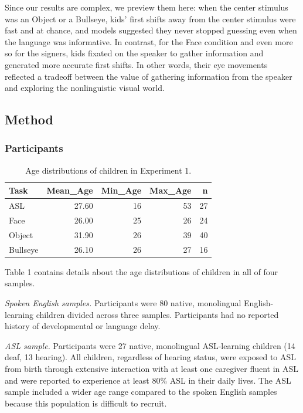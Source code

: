 \documentclass[10pt, letterpaper]{article}
\begin{document}
Since our results are complex, we preview them here: when the center
stimulus was an Object or a Bullseye, kids' first shifts away from the
center stimulus were fast and at chance, and models suggested they never
stopped guessing even when the language was informative. In contrast,
for the Face condition and even more so for the signers, kids fixated on
the speaker to gather information and generated more accurate first
shifts. In other words, their eye movements reflected a tradeoff between
the value of gathering information from the speaker and exploring the
nonlinguistic visual world.

\subsection{Method}\label{method}

\subsubsection{Participants}\label{participants}

\begin{table}[b]
\centering
\begin{tabular}{lrrrr}
  \hline
Task & Mean\_Age & Min\_Age & Max\_Age & n \\ 
  \hline
ASL & 27.60 &  16 &  53 &  27 \\ 
  Face & 26.00 &  25 &  26 &  24 \\ 
  Object & 31.90 &  26 &  39 &  40 \\ 
  Bullseye & 26.10 &  26 &  27 &  16 \\ 
   \hline
\end{tabular}
\caption{Age distributions of children in Experiment 1.} 
\end{table}

Table 1 contains details about the age distributions of children in all
of four samples.

\emph{Spoken English samples.} Participants were 80 native, monolingual
English-learning children divided across three samples. Participants had
no reported history of developmental or language delay.

\emph{ASL sample.} Participants were 27 native, monolingual ASL-learning
children (14 deaf, 13 hearing). All children, regardless of hearing
status, were exposed to ASL from birth through extensive interaction
with at least one caregiver fluent in ASL and were reported to
experience at least 80\% ASL in their daily lives. The ASL sample
included a wider age range compared to the spoken English samples
because this population is difficult to recruit.
\end{document}
